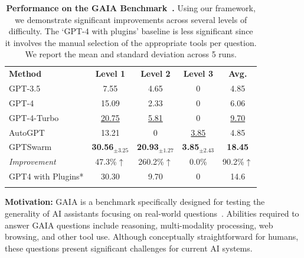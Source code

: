 \documentclass{article}
\theoremstyle{plain}
\theoremstyle{definition}
\theoremstyle{remark}
\begin{document}
\begin{table}[t!]
  \centering
  \caption{
  \textbf{Performance on the GAIA Benchmark~\citep{mialon2023gaia}.}
  Using our framework, we demonstrate significant improvements across several levels of difficulty.
  The `GPT-4 with plugins' baseline is less significant since it involves the manual selection of the appropriate tools per question.
  We report the mean and standard deviation across 5 runs.
  }
  \label{tab:gaia}
  
  \renewcommand\tabcolsep{2.9pt}
  \renewcommand\arraystretch{1.1}
  \footnotesize 
  \begin{tabular}{l|cccc} 
    \Xhline{1pt}
    \rowcolor{champagne} 
    \textbf{Method} & \textbf{Level 1} & \textbf{Level 2} & \textbf{Level 3} & \textbf{Avg.} \\
    \Xhline{1.2pt}
    GPT-3.5 & 7.55 & 4.65 & 0 & 4.85 \\
    \rowcolor{gray!10}GPT-4 & 15.09 & 2.33 & 0 & 6.06 \\
    GPT-4-Turbo & \underline{20.75} & \underline{5.81} & 0 & \underline{9.70} \\
    \rowcolor{gray!10} AutoGPT & 13.21 & 0 & \underline{3.85} & 4.85 \\
    \hline
    GPTSwarm 
    & \textbf{30.56}$_{\pm\text{3.25}}$
    & \textbf{20.93}$_{\pm\text{1.27}}$
    & \textbf{3.85}$_{\pm\text{2.43}}$
    & \textbf{18.45}
    \\
    \rowcolor{gray!10}
    {\textit{Improvement}}
    & \textcolor{green(pigment)}{47.3\%$\uparrow$}
    & \textcolor{green(pigment)}{260.2\%$\uparrow$}
    & \textcolor{green(pigment)}{0.0\%}
    & \textcolor{green(pigment)}{90.2\%$\uparrow$}
    \\
    \hline
    \textcolor{black!50}{GPT4 with Plugins*}  & \textcolor{black!50}{30.30} & \textcolor{black!50}{9.70} & \textcolor{black!50}{0} & \textcolor{black!50}{14.6} \\
    \Xhline{1.2pt}
  \end{tabular}
\end{table}

\noindent \textbf{Motivation:} 
GAIA is a benchmark specifically designed for testing the generality of AI assistants focusing on real-world questions~\citep{mialon2023gaia}.
Abilities required to answer GAIA questions include reasoning, multi-modality processing, web browsing, and other tool use.
Although conceptually straightforward for humans, these questions present significant challenges for current AI systems.
\end{document}
